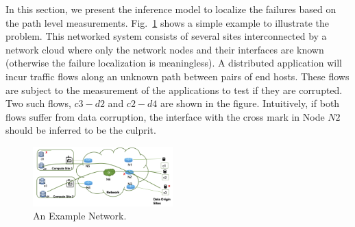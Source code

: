 In this section, we present the inference model to localize the failures based on the path level measurements. 
Fig.~\ref{fig:example} shows a simple example to illustrate the problem. This networked system consists of several sites interconnected by a network cloud where only the network nodes and their interfaces are known (otherwise the failure localization is meaningless). 
A distributed application will incur traffic flows along an unknown path between pairs of end hosts. These flows are subject to the measurement of the applications to test if they are corrupted. Two such flows, $c3-d2$ and $c2-d4$ are shown in the figure. Intuitively, if both flows suffer from data corruption, the interface with the cross mark in Node $N2$ should be inferred to be the culprit.   

\begin{figure}
  \begin{center}
    \includegraphics[width=0.48\textwidth]{./figure/example_network.png}
  \end{center}
\caption{An Example Network.}
\label{fig:example}
\end{figure}

